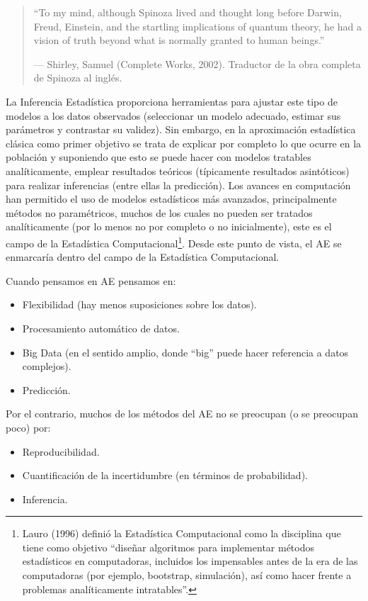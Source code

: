 \documentclass[
]{book}
\theoremstyle{break}
\theoremstyle{definition}
\theoremstyle{definition}
\theoremstyle{definition}
\theoremstyle{remark}
\begin{document}
\begin{quote}
``To my mind, although Spinoza lived and thought long before Darwin, Freud, Einstein, and the startling implications of quantum theory, he had a vision of truth beyond what is normally granted to human beings.''

--- Shirley, Samuel (Complete Works, 2002). Traductor de la obra completa de Spinoza al inglés.
\end{quote}

La Inferencia Estadística proporciona herramientas para ajustar este tipo de modelos a los datos observados (seleccionar un modelo adecuado, estimar sus parámetros y contrastar su validez).
Sin embargo, en la aproximación estadística clásica como primer objetivo se trata de explicar por completo lo que ocurre en la población y suponiendo que esto se puede hacer con modelos tratables analíticamente, emplear resultados teóricos (típicamente resultados asintóticos) para realizar inferencias (entre ellas la predicción).
Los avances en computación han permitido el uso de modelos estadísticos más avanzados, principalmente métodos no paramétricos, muchos de los cuales no pueden ser tratados analíticamente (por lo menos no por completo o no inicialmente), este es el campo de la Estadística Computacional\footnote{Lauro (1996) definió la Estadística Computacional como la disciplina que tiene como objetivo ``diseñar algoritmos para implementar métodos estadísticos en computadoras, incluidos los impensables antes de la era de las computadoras (por ejemplo, bootstrap, simulación), así como hacer frente a problemas analíticamente intratables''.}. Desde este punto de vista, el AE se enmarcaría dentro del campo de la Estadística Computacional.

Cuando pensamos en AE pensamos en:

\begin{itemize}
\item
  Flexibilidad (hay menos suposiciones sobre los datos).
\item
  Procesamiento automático de datos.
\item
  Big Data (en el sentido amplio, donde ``big'' puede hacer referencia a datos complejos).
\item
  Predicción.
\end{itemize}

Por el contrario, muchos de los métodos del AE no se preocupan (o se preocupan poco) por:

\begin{itemize}
\item
  Reproducibilidad.
\item
  Cuantificación de la incertidumbre (en términos de probabilidad).
\item
  Inferencia.
\end{itemize}
\end{document}
